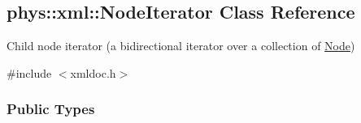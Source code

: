\hypertarget{classphys_1_1xml_1_1NodeIterator}{
\subsection{phys::xml::NodeIterator Class Reference}
\label{classphys_1_1xml_1_1NodeIterator}
}


Child node iterator (a bidirectional iterator over a collection of \hyperlink{classphys_1_1xml_1_1Node}{Node})  




{\ttfamily \#include $<$xmldoc.h$>$}

\subsubsection*{Public Types}
